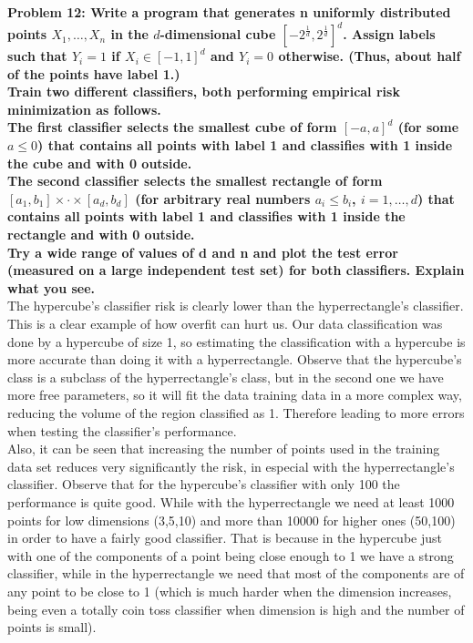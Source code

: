 \documentclass[11pt, english]{article}
\begin{document}
\textbf{Problem 12: Write a program that generates n uniformly distributed points $X_1,\dots,X_n$ in the $d$-dimensional cube $[-2^{\frac{1}{d}},2^{\frac{1}{d}}]^d$. Assign labels such that $Y_i=1$ if $X_i\in[-1,1]^d$ and $Y_i=0$ otherwise. (Thus, about half of the points have label 1.)}\\
\textbf{Train two different classifiers, both performing empirical risk minimization as follows.}\\
\textbf{The first classifier selects the smallest cube of form $[-a,a]^d$ (for some $a\leq0$) that contains all points with label 1 and classifies with 1 inside the cube and with 0 outside.}\\
\textbf{The second classifier selects the smallest rectangle of form$[a_1,b_1]\times\cdot\times[a_d,b_d]$ (for arbitrary real numbers $a_i\leq b_i$, $i=1,\dots,d$) that contains all points with label 1 and classifies with 1 inside the rectangle and with 0 outside.}\\
\textbf{Try a wide range of values of d and n and plot the test error (measured on a large independent test set) for both classifiers. Explain what you see.}\\

The hypercube's classifier risk is clearly lower than the hyperrectangle's classifier. This is a clear example of how overfit can hurt us. Our data classification was done by a hypercube of size 1, so estimating the classification with a hypercube is more accurate than doing it with a hyperrectangle. Observe that the hypercube's class is a subclass of the hyperrectangle's class, but in the second one we have more free parameters, so it will fit the data training data in a more complex way, reducing the volume of the region classified as 1. Therefore leading to more errors when testing the classifier's performance.\\

Also, it can be seen that increasing the number of points used in the training data set reduces very significantly the risk, in especial with the hyperrectangle's classifier. Observe that for the hypercube's classifier with only 100 the performance is quite good. While with the hyperrectangle we need at least 1000 points for low dimensions (3,5,10) and more than 10000 for higher ones (50,100) in order to have a fairly good classifier. That is because in the hypercube just with one of the components of a point being close enough to 1 we have a strong classifier, while in the hyperrectangle we need that most of the components are of any point to be close to 1 (which is much harder when the dimension increases, being even a totally coin toss classifier when dimension is high and the number of points is small). 
\end{document}
